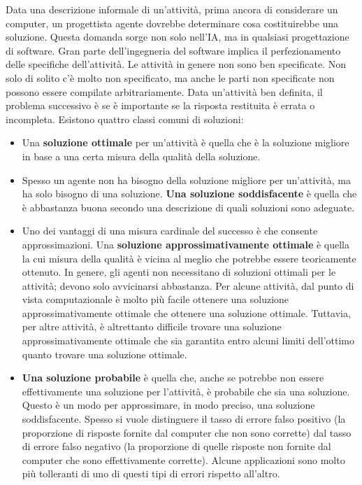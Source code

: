 \documentclass[a4paper]{extarticle}
\begin{document}
Data una descrizione informale di un'attività, prima ancora di considerare un computer, un progettista agente dovrebbe determinare cosa costituirebbe una soluzione. Questa domanda sorge non solo nell'IA, ma in qualsiasi progettazione di software. Gran parte dell'ingegneria del software implica il perfezionamento delle specifiche dell'attività. Le attività in genere non sono ben specificate. Non solo di solito c'è molto non specificato, ma anche le parti non specificate non possono essere compilate arbitrariamente. Data un'attività ben definita, il problema successivo è se è importante se la risposta restituita è errata o incompleta. Esistono quattro classi comuni di soluzioni:
\begin{itemize}
\item Una \textbf{soluzione ottimale} per un'attività è quella che è la soluzione migliore in base a una certa misura della qualità della soluzione.
\item Spesso un agente non ha bisogno della soluzione migliore per un'attività, ma ha solo bisogno di una soluzione. \textbf{Una soluzione soddisfacente} è quella che è abbastanza buona secondo una descrizione di quali soluzioni sono adeguate.
\item Uno dei vantaggi di una misura cardinale del successo è che consente approssimazioni. Una \textbf{soluzione approssimativamente ottimale} è quella la cui misura della qualità è vicina al meglio che potrebbe essere teoricamente ottenuto. In genere, gli agenti non necessitano di soluzioni ottimali per le attività; devono solo avvicinarsi abbastanza. Per alcune attività, dal punto di vista computazionale è molto più facile ottenere una soluzione approssimativamente ottimale che ottenere una soluzione ottimale. Tuttavia, per altre attività, è altrettanto difficile trovare una soluzione approssimativamente ottimale che sia garantita entro alcuni limiti dell'ottimo quanto trovare una soluzione ottimale.

\item \textbf{Una soluzione probabile} è quella che, anche se potrebbe non essere effettivamente una soluzione per l'attività, è probabile che sia una soluzione. Questo è un modo per approssimare, in modo preciso, una soluzione soddisfacente. Spesso si vuole distinguere il tasso di errore falso positivo (la proporzione di risposte fornite dal computer che non sono corrette) dal tasso di errore falso negativo (la proporzione di quelle risposte non fornite dal computer che sono effettivamente corrette). Alcune applicazioni sono molto più tolleranti di uno di questi tipi di errori rispetto all'altro.
\end{itemize}
\end{document}
